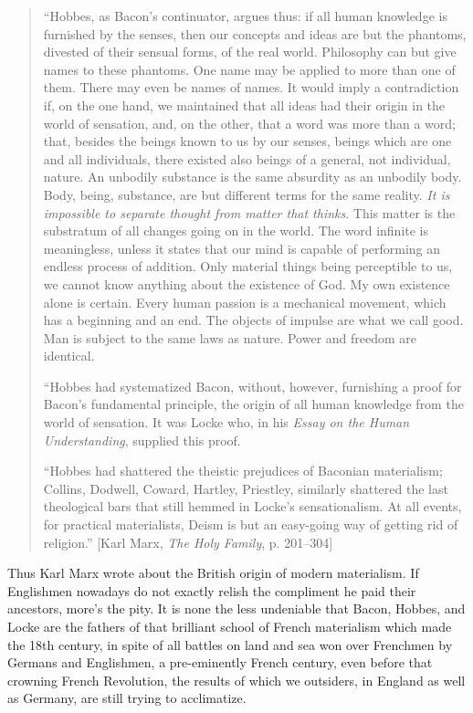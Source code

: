 \begin{quote}
  ``Hobbes, as Bacon's continuator, argues thus: if all human knowledge is
  furnished by the senses, then our concepts and ideas are but the phantoms,
  divested of their sensual forms, of the real world. Philosophy can but give
  names to these phantoms. One name may be applied to more than one of them.
  There may even be names of names. It would imply a contradiction if, on the
  one hand, we maintained that all ideas had their origin in the world of
  sensation, and, on the other, that a word was more than a word; that,
  besides the beings known to us by our senses, beings which are one and all
  individuals, there existed also beings of a general, not individual, nature.
  An unbodily substance is the same absurdity as an unbodily body. Body, being,
  substance, are but different terms for the same reality. \emph{It is
  impossible to separate thought from matter that thinks}. This matter is the
  substratum of all changes going on in the world. The word infinite is
  meaningless, unless it states that our mind is capable of performing an
  endless process of addition. Only material things being perceptible to us, we
  cannot know anything about the existence of God. My own existence alone is
  certain. Every human passion is a mechanical movement, which has a beginning
  and an end. The objects of impulse are what we call good. Man is subject to
  the same laws as nature. Power and freedom are identical.

  ``Hobbes had systematized Bacon, without, however, furnishing a proof for
  Bacon's fundamental principle, the origin of all human knowledge from the
  world of sensation. It was Locke who, in his \emph{Essay on the Human
  Understanding}, supplied this proof.

  ``Hobbes had shattered the theistic prejudices of Baconian materialism;
  Collins, Dodwell, Coward, Hartley, Priestley, similarly shattered the last
  theological bars that still hemmed in Locke's sensationalism. At all events,
  for practical materialists, Deism is but an easy-going way of getting rid of
  religion.'' [Karl Marx, \emph{The Holy Family}, p. 201--304]
\end{quote}
%
Thus Karl Marx wrote about the British origin of modern materialism. If
Englishmen nowadays do not exactly relish the compliment he paid their
ancestors, more's the pity. It is none the less undeniable that Bacon, Hobbes,
and Locke are the fathers of that brilliant school of French materialism which
made the 18th century, in spite of all battles on land and sea won over
Frenchmen by Germans and Englishmen, a pre-eminently French century, even
before that crowning French Revolution, the results of which we outsiders, in
England as well as Germany, are still trying to acclimatize.

